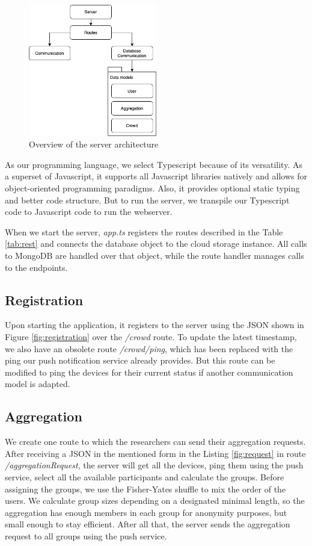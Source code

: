\begin{figure}[htpb]
  \centering
  \includegraphics[width=0.5\textwidth]{figures/server}
  \caption{Overview of the server architecture} \label{fig:server}
\end{figure}

As our programming language, we select Typescript because of its versatility. As a superset of Javascript, it supports all Javascript libraries natively and allows for object-oriented programming paradigms. Also, it provides optional static typing and better code structure. But to run the server, we transpile our Typescript code to Javascript code to run the webserver.

When we start the server, \textit{app.ts} registers the routes described in the Table \ref{tab:rest} and connects the database object to the cloud storage instance. All calls to MongoDB are handled over that object, while the route handler manages calls to the endpoints.

\subsection{Registration}
Upon starting the application, it registers to the server using the JSON shown in Figure \ref{fig:registration} over the \textit{/crowd} route. To update the latest timestamp, we also have an obsolete route \textit{/crowd/ping}, which has been replaced with the ping our push notification service already provides. But this route can be modified to ping the devices for their current status if another communication model is adapted.

\subsection{Aggregation}
We create one route to which the researchers can send their aggregation requests. After receiving a JSON in the mentioned form in the Listing \ref{fig:request} in route \textit{/aggregationRequest}, the server will get all the devices, ping them using the push service, select all the available participants and calculate the groups. Before assigning the groups, we use the Fisher-Yates shuffle to mix the order of the users. We calculate group sizes depending on a designated minimal length, so the aggregation has enough members in each group for anonymity purposes, but small enough to stay efficient. After all that, the server sends the aggregation request to all groups using the push service.

